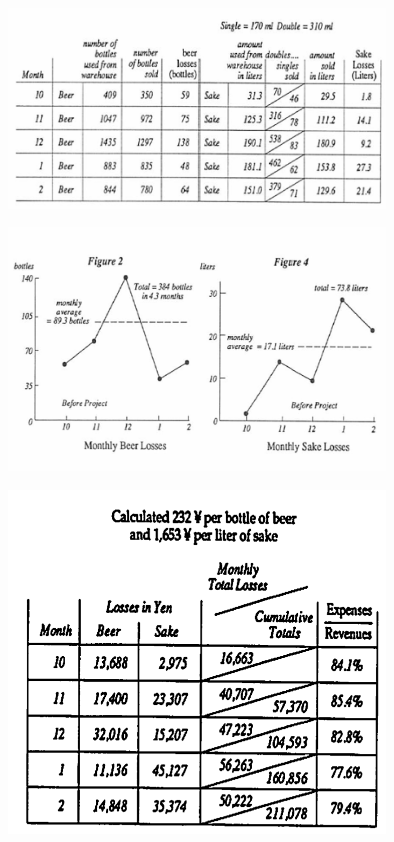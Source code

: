 
\includegraphics[width=10cm]{club6.png}


\includegraphics[width=10cm]{club7.png}


\includegraphics[width=10cm]{club8.png}


